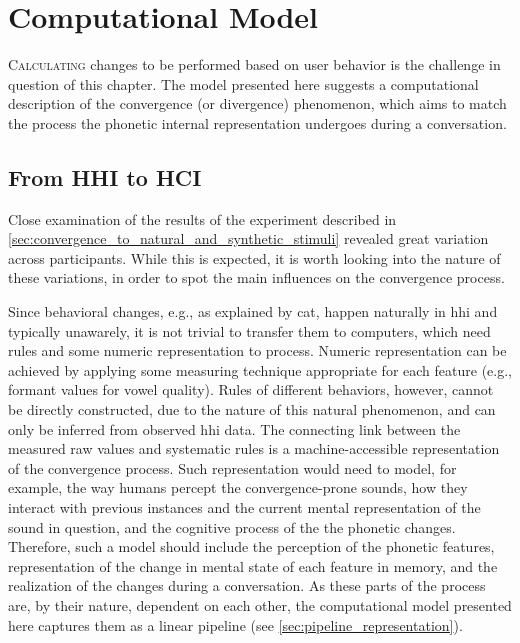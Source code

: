 \chapter[Computational Model]{Computational Model}
\label{chap:computational_model}

\lettrine{C}{alculating} changes to be performed based on user behavior is the challenge in question of this chapter.
The model presented here suggests a computational description of the convergence (or divergence) phenomenon, which aims to match the process the phonetic internal representation undergoes during a conversation.

\pagebreak

\section{From HHI to HCI}
\label{sec:from_hhi_to_hci}

Close examination of the results of the experiment described in \cref{sec:convergence_to_natural_and_synthetic_stimuli} revealed great variation across participants. 
While this is expected, it is worth looking into the nature of these variations, in order to spot the main influences on the convergence process.

Since behavioral changes, e.g., as explained by \ac{cat}, happen naturally in \ac{hhi} and typically unawarely, it is not trivial to transfer them to computers, which need rules and some numeric representation to process.
Numeric representation can be achieved by applying some measuring technique appropriate for each feature (e.g., formant values for vowel quality).
Rules of different behaviors, however, cannot be directly constructed, due to the nature of this natural phenomenon, and can only be inferred from observed \ac{hhi} data.
The connecting link between the measured raw values and systematic rules is a machine-accessible representation of the convergence process.
Such representation would need to model, for example, the way humans percept the convergence-prone sounds, how they interact with previous instances and the current mental representation of the sound in question, and the cognitive process of the the phonetic changes.
Therefore, such a model should include the perception of the phonetic features, representation of the change in mental state of each feature in memory, and the realization of the changes during a conversation.
As these parts of the process are, by their nature, dependent on each other, the computational model presented here captures them as a linear pipeline (see \cref{sec:pipeline_representation}).

